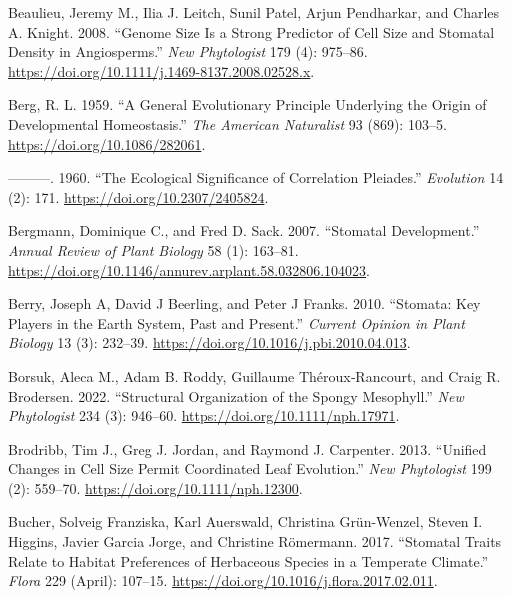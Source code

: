 \documentclass[
  12pt,
]{article}
\newlength{\cslhangindent}
\newlength{\cslentryspacingunit} %
\newenvironment{CSLReferences}[2] %
 {%
  \setlength{\parindent}{0pt}
  \ifodd #1
  \let\oldpar\par
  \def\par{\hangindent=\cslhangindent\oldpar}
  \fi
  \setlength{\parskip}{#2\cslentryspacingunit}
 }%
 {}
\begin{document}
\begin{CSLReferences}{1}{0}
\leavevmode{}%
Beaulieu, Jeremy M., Ilia J. Leitch, Sunil Patel, Arjun Pendharkar, and Charles A. Knight. 2008. {``Genome Size Is a Strong Predictor of Cell Size and Stomatal Density in Angiosperms.''} \emph{New Phytologist} 179 (4): 975--86. \url{https://doi.org/10.1111/j.1469-8137.2008.02528.x}.

\leavevmode{}%
Berg, R. L. 1959. {``A {General} {Evolutionary} {Principle} {Underlying} the {Origin} of {Developmental} {Homeostasis}.''} \emph{The American Naturalist} 93 (869): 103--5. \url{https://doi.org/10.1086/282061}.

\leavevmode{}%
---------. 1960. {``The {Ecological} {Significance} of {Correlation} {Pleiades}.''} \emph{Evolution} 14 (2): 171. \url{https://doi.org/10.2307/2405824}.

\leavevmode{}%
Bergmann, Dominique C., and Fred D. Sack. 2007. {``Stomatal {Development}.''} \emph{Annual Review of Plant Biology} 58 (1): 163--81. \url{https://doi.org/10.1146/annurev.arplant.58.032806.104023}.

\leavevmode{}%
Berry, Joseph A, David J Beerling, and Peter J Franks. 2010. {``Stomata: Key Players in the Earth System, Past and Present.''} \emph{Current Opinion in Plant Biology} 13 (3): 232--39. \url{https://doi.org/10.1016/j.pbi.2010.04.013}.

\leavevmode{}%
Borsuk, Aleca M., Adam B. Roddy, Guillaume Théroux‐Rancourt, and Craig R. Brodersen. 2022. {``Structural Organization of the Spongy Mesophyll.''} \emph{New Phytologist} 234 (3): 946--60. \url{https://doi.org/10.1111/nph.17971}.

\leavevmode{}%
Brodribb, Tim J., Greg J. Jordan, and Raymond J. Carpenter. 2013. {``Unified Changes in Cell Size Permit Coordinated Leaf Evolution.''} \emph{New Phytologist} 199 (2): 559--70. \url{https://doi.org/10.1111/nph.12300}.

\leavevmode{}%
Bucher, Solveig Franziska, Karl Auerswald, Christina Grün-Wenzel, Steven I. Higgins, Javier Garcia Jorge, and Christine Römermann. 2017. {``Stomatal Traits Relate to Habitat Preferences of Herbaceous Species in a Temperate Climate.''} \emph{Flora} 229 (April): 107--15. \url{https://doi.org/10.1016/j.flora.2017.02.011}.


\end{CSLReferences}
\end{document}
